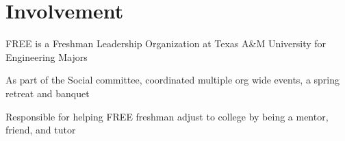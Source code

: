 \documentclass[letterpaper]{deedy-resume} %
\begin{document}
\begin{minipage}[t]{0.66\textwidth}

\section{Involvement} 


\begin{tightitemize}
\item FREE is a Freshman Leadership Organization at Texas A\&M University for Engineering Majors
\item As part of the Social committee, coordinated multiple org wide events, a spring retreat and banquet
\end{tightitemize}

\sectionspace %



\begin{tightitemize}
\item Responsible for helping FREE freshman adjust to college by being a mentor, friend, and tutor
\end{tightitemize}

\sectionspace %






\end{minipage} %
\end{document}
